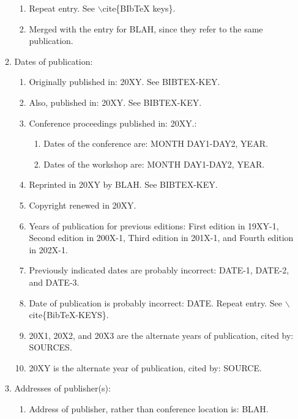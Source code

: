 \documentclass[letter,12pt]{article}
\begin{document}
\begin{enumerate}
\begin{enumerate}
		\begin{enumerate} \itemsep -2pt
		\item Repeat entry. See $\backslash$cite\{BIbTeX keys\}.
		\item Merged with the entry for BLAH, since they refer to the same publication.
		\end{enumerate}
	\item Dates of publication: \vspace{-0.2cm}
		\begin{enumerate} \itemsep -2pt
		\item Originally published in: 20XY. See BIBTEX-KEY.
		\item Also, published in: 20XY. See BIBTEX-KEY.
		\item Conference proceedings published in: 20XY.: \vspace{-0.1cm}
			\begin{enumerate} \itemsep -1pt
			\item Dates of the conference are: MONTH DAY1-DAY2, YEAR.
			\item Dates of the workshop are: MONTH DAY1-DAY2, YEAR.
			\end{enumerate}
		\item Reprinted in 20XY by BLAH. See BIBTEX-KEY.
		\item Copyright renewed in 20XY.
		\item Years of publication for previous editions: First edition in 19XY-1, Second edition in 200X-1, Third edition in 201X-1, and Fourth edition in 202X-1.
		\item Previously indicated dates are probably incorrect: DATE-1, DATE-2, and DATE-3.
		\item Date of publication is probably incorrect: DATE. Repeat entry. See $\backslash$cite\{BibTeX-KEYS\}.
		\item 20X1, 20X2, and 20X3 are the alternate years of publication, cited by: SOURCES.
		\item 20XY is the alternate year of publication, cited by: SOURCE.
		\end{enumerate}
	\item Addresses of publisher(s): \vspace{-0.2cm}
		\begin{enumerate} \itemsep -2pt
		\item Address of publisher, rather than conference location is: BLAH.

\end{enumerate}
\end{enumerate}
\end{enumerate}
\end{document}
